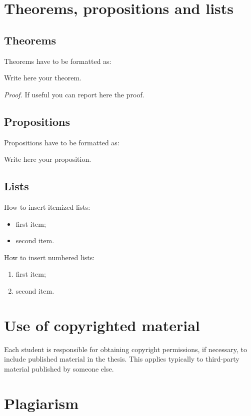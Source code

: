 \documentclass{report}
\begin{document}
\vspace{5mm}

\section{Theorems, propositions and lists}

\subsection{Theorems}
Theorems have to be formatted as:
\begin{theorem}
\label{a_theorem}
Write here your theorem. 
\end{theorem}
\textit{Proof.} If useful you can report here the proof.

\subsection{Propositions}
Propositions have to be formatted as:
\begin{proposition}
Write here your proposition.
\end{proposition}

\subsection{Lists}
How to  insert itemized lists:
\begin{itemize}
    \item first item;
    \item second item.
\end{itemize}
How to insert numbered lists:
\begin{enumerate}
    \item first item;
    \item second item.
\end{enumerate}

\section{Use of copyrighted material}

Each student is responsible for obtaining copyright permissions, if necessary, to include published material in the thesis.
This applies typically to third-party material published by someone else.

\section{Plagiarism}
\end{document}

